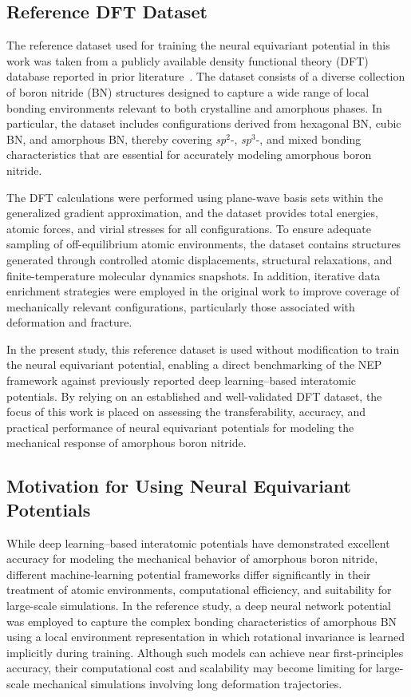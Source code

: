 \documentclass[review, 12pt]{elsarticle}
\numberwithin{equation}{section}
\begin{document}
\subsection{Reference DFT Dataset}
\label{sec:dataset}

The reference dataset used for training the neural equivariant potential in this work was taken from a publicly available density functional theory (DFT) database reported in prior literature~\cite{ju2024illuminating}. The dataset consists of a diverse collection of boron nitride (BN) structures designed to capture a wide range of local bonding environments relevant to both crystalline and amorphous phases. In particular, the dataset includes configurations derived from hexagonal BN, cubic BN, and amorphous BN, thereby covering \textit{sp}$^{2}$-, \textit{sp}$^{3}$-, and mixed bonding characteristics that are essential for accurately modeling amorphous boron nitride.

The DFT calculations were performed using plane-wave basis sets within the generalized gradient approximation, and the dataset provides total energies, atomic forces, and virial stresses for all configurations. To ensure adequate sampling of off-equilibrium atomic environments, the dataset contains structures generated through controlled atomic displacements, structural relaxations, and finite-temperature molecular dynamics snapshots. In addition, iterative data enrichment strategies were employed in the original work to improve coverage of mechanically relevant configurations, particularly those associated with deformation and fracture.

In the present study, this reference dataset is used without modification to train the neural equivariant potential, enabling a direct benchmarking of the NEP framework against previously reported deep learning--based interatomic potentials. By relying on an established and well-validated DFT dataset, the focus of this work is placed on assessing the transferability, accuracy, and practical performance of neural equivariant potentials for modeling the mechanical response of amorphous boron nitride.

\subsection{Motivation for Using Neural Equivariant Potentials}
\label{sec:nep_motivation}

While deep learning--based interatomic potentials have demonstrated excellent accuracy for modeling the mechanical behavior of amorphous boron nitride, different machine-learning potential frameworks differ significantly in their treatment of atomic environments, computational efficiency, and suitability for large-scale simulations. In the reference study, a deep neural network potential was employed to capture the complex bonding characteristics of amorphous BN using a local environment representation in which rotational invariance is learned implicitly during training. Although such models can achieve near first-principles accuracy, their computational cost and scalability may become limiting for large-scale mechanical simulations involving long deformation trajectories.
\end{document}
